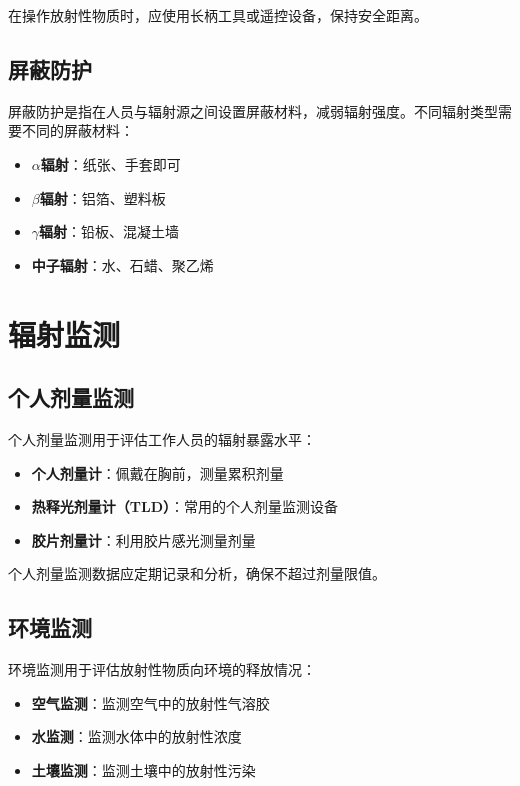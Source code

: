 \documentclass[12pt,UTF8]{ctexbook}
\begin{document}
在操作放射性物质时，应使用长柄工具或遥控设备，保持安全距离。

\section{屏蔽防护}

屏蔽防护是指在人员与辐射源之间设置屏蔽材料，减弱辐射强度。不同辐射类型需要不同的屏蔽材料：

\begin{itemize}[leftmargin=2cm]
    \item \textbf{$\alpha$辐射}：纸张、手套即可
    \item \textbf{$\beta$辐射}：铝箔、塑料板
    \item \textbf{$\gamma$辐射}：铅板、混凝土墙
    \item \textbf{中子辐射}：水、石蜡、聚乙烯
\end{itemize}

\chapter{辐射监测}

\section{个人剂量监测}

个人剂量监测用于评估工作人员的辐射暴露水平：

\begin{itemize}[leftmargin=2cm]
    \item \textbf{个人剂量计}：佩戴在胸前，测量累积剂量
    \item \textbf{热释光剂量计（TLD）}：常用的个人剂量监测设备
    \item \textbf{胶片剂量计}：利用胶片感光测量剂量
\end{itemize}

个人剂量监测数据应定期记录和分析，确保不超过剂量限值。

\section{环境监测}

环境监测用于评估放射性物质向环境的释放情况：

\begin{itemize}[leftmargin=2cm]
    \item \textbf{空气监测}：监测空气中的放射性气溶胶
    \item \textbf{水监测}：监测水体中的放射性浓度
    \item \textbf{土壤监测}：监测土壤中的放射性污染
\end{itemize}
\end{document}
